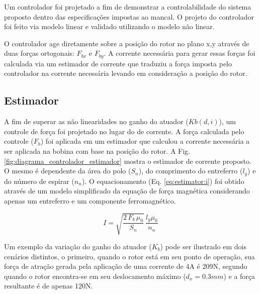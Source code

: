 Um controlador foi projetado a fim de demonstrar a controlabilidade do sistema proposto dentro das especificações impostas ao mancal. O projeto do controlador foi feito via modelo linear e validado utilizando o modelo não linear. 

O controlador age diretamente sobre a posição do rotor no plano x,y através de duas forças ortogonais: $F_{bx}$ e $F_{by}$. A corrente necessária para gerar essas forças foi calculada via um estimador de corrente que traduziu a força imposta pelo controlador na corrente necessária levando em consideração a posição do rotor.


\subsection{Estimador}
	
A fim de superar as não linearidades no ganho do atuador ($Kb(d,i)$), um controle de força foi projetado no lugar do de corrente. A força calculada pelo controle ($F_b$) foi aplicada em um estimador que calculou a corrente necessária a ser aplicada na bobina com base na posição do rotor. A Fig. \ref{fig:diagrama_controlador_estimador} mostra o estimador de corrente proposto. O mesmo é dependente da área do polo ($S_n$), do comprimento do entreferro ($l_g$) e do número de espirar ($n_n$). O equacionamento (Eq. \eqref{eq:estimator:i}) foi obtido através de um modelo simplificado da equação de força magnética considerando apenas um entreferro e um componente ferromagnético.

	
\begin{equation}
I = \sqrt{\frac{2 \, F_b \, \mu_0}{S_n}} \, \frac{l_g \mu_0}{n_n}
\label{eq:estimator:i}
\end{equation}
	
Um exemplo da variação do ganho do atuador ($K_b$) pode ser ilustrado em dois cenários distintos, o primeiro, quando o rotor está em seu ponto de operação, sua força de atração gerada pela aplicação de uma corrente de 4A é 209N, segundo quando o rotor encontra-se em seu deslocamento máximo ($d_x = 0.3 mm$) e a força resultante é de apenas 120N.

